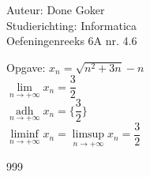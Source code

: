 \documentclass[a4paper]{article}
\begin{document}
  
\noindent \large Auteur: Done Goker \\
\noindent \large Studierichting: Informatica\\
\noindent \large Oefeningenreeks 6A nr. 4.6\\

\medskip

\normalsize


Opgave: $x_n = \sqrt{n^2 + 3n} -n$ \\

$\lim  \limits_  {n \rightarrow +  \infty} x_n = \dfrac{3}{2}$  \\

$\operatorname*{adh}\limits_{n \rightarrow +\infty} x_n = \{ \dfrac{3}{2}\}$\\

$\liminf\limits_{n \rightarrow +\infty} x_n = \limsup\limits_{n \rightarrow +\infty} x_n = \dfrac{3}{2}$\\

\begin{thebibliography}{999}
\end{thebibliography}
\end{document}
